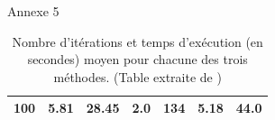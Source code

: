 \documentclass[10pt]{beamer}
\begin{document}
\begin{frame}{Annexe 5}
\begin{table}[]
\begin{tabular}{@{}|l|llllll@{}}
        100                                           & \multicolumn{1}{l|}{5.81} & \multicolumn{1}{l|}{\textbf{28.45}} & \multicolumn{1}{l|}{\textbf{2.0}}  & \multicolumn{1}{l|}{134}   & \multicolumn{1}{l|}{5.18} & \multicolumn{1}{l|}{44.0}  \\ \bottomrule
        \end{tabular}
        \caption{Nombre d'itérations et temps d'exécution (en secondes) moyen pour chacune des trois méthodes. (Table extraite de \cite{portoleau_SMAI})}
    \end{table}
\end{frame}
\end{document}
